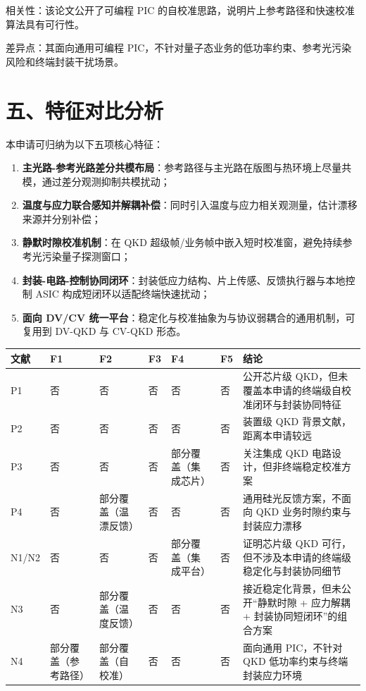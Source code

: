 \documentclass[12pt,a4paper]{article}
\begin{document}
相关性：该论文公开了可编程 PIC 的自校准思路，说明片上参考路径和快速校准算法具有可行性。

差异点：其面向通用可编程 PIC，不针对量子态业务的低功率约束、参考光污染风险和终端封装干扰场景。

\section*{五、特征对比分析}

本申请可归纳为以下五项核心特征：
\begin{enumerate}[label=F\arabic*.]
    \item \textbf{主光路-参考光路差分共模布局}：参考路径与主光路在版图与热环境上尽量共模，通过差分观测抑制共模扰动；
    \item \textbf{温度与应力联合感知并解耦补偿}：同时引入温度与应力相关观测量，估计漂移来源并分别补偿；
    \item \textbf{静默时隙校准机制}：在 QKD 超级帧/业务帧中嵌入短时校准窗，避免持续参考光污染量子探测窗口；
    \item \textbf{封装-电路-控制协同闭环}：封装低应力结构、片上传感、反馈执行器与本地控制 ASIC 构成短闭环以适配终端快速扰动；
    \item \textbf{面向 DV/CV 统一平台}：稳定化与校准抽象为与协议弱耦合的通用机制，可复用到 DV-QKD 与 CV-QKD 形态。
\end{enumerate}

\renewcommand{\arraystretch}{1.3}
\small
\setlength{\tabcolsep}{3pt}
\begin{tabularx}{\textwidth}{|L{1.4cm}|L{1.7cm}|L{1.7cm}|L{1.7cm}|L{1.7cm}|L{1.7cm}|X|}
\hline
\textbf{文献} & \textbf{F1} & \textbf{F2} & \textbf{F3} & \textbf{F4} & \textbf{F5} & \textbf{结论} \\
\hline
P1 & 否 & 否 & 否 & 否 & 否 & 公开芯片级 QKD，但未覆盖本申请的终端级自校准闭环与封装协同特征 \\
\hline
P2 & 否 & 否 & 否 & 否 & 否 & 装置级 QKD 背景文献，距离本申请较远 \\
\hline
P3 & 否 & 否 & 否 & 部分覆盖（集成芯片） & 否 & 关注集成 QKD 电路设计，但非终端稳定校准方案 \\
\hline
P4 & 否 & 部分覆盖（温漂反馈） & 否 & 否 & 否 & 通用硅光反馈方案，不面向 QKD 业务时隙约束与封装应力漂移 \\
\hline
N1/N2 & 否 & 否 & 否 & 部分覆盖（集成平台） & 否 & 证明芯片级 QKD 可行，但不涉及本申请的终端级稳定化与封装协同细节 \\
\hline
N3 & 否 & 部分覆盖（温度反馈） & 否 & 否 & 否 & 接近稳定化背景，但未公开“静默时隙 + 应力解耦 + 封装协同短闭环”的组合方案 \\
\hline
N4 & 部分覆盖（参考路径） & 部分覆盖（自校准） & 否 & 否 & 否 & 面向通用 PIC，不针对 QKD 低功率约束与终端封装应力环境 \\
\hline
\end{tabularx}
\normalsize
\setlength{\tabcolsep}{6pt}
\end{document}
